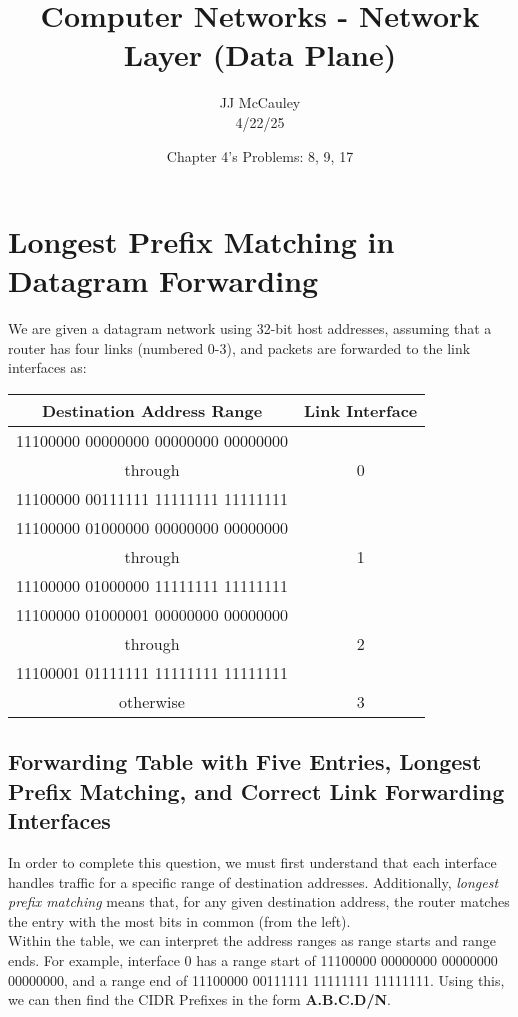 \documentclass[colorlinks=true, allcolors=blue]{article}
\title{Computer Networks - Network Layer (Data Plane)}
\author{JJ McCauley \\ 4/22/25}
\date{Chapter 4's Problems: 8, 9, 17}
\begin{document}
\maketitle

\setcounter{section}{7}
\section{Longest Prefix Matching in Datagram Forwarding}
We are given a datagram network using 32-bit host addresses, assuming that a router has four links (numbered 0-3), and packets are forwarded to the link interfaces as:

\renewcommand{\arraystretch}{1.5}
\begin{center}
\begin{tabular}{|c|c|}
\hline
\textbf{Destination Address Range} & \textbf{Link Interface} \\
\hline
11100000 00000000 00000000 00000000 & \\
through & 0 \\
11100000 00111111 11111111 11111111 & \\
\hline
11100000 01000000 00000000 00000000 & \\
through & 1 \\
11100000 01000000 11111111 11111111 & \\
\hline
11100000 01000001 00000000 00000000 & \\
through & 2 \\
11100001 01111111 11111111 11111111 & \\
\hline
otherwise & 3 \\
\hline  
\end{tabular}
\end{center}

\subsection{Forwarding Table with Five Entries, Longest Prefix Matching, and Correct Link Forwarding Interfaces}
In order to complete this question, we must first understand that each interface handles traffic for a specific range of destination addresses. Additionally, \textit{longest prefix matching} means that, for any given destination address, the router matches the entry with the most bits in common (from the left). \\

Within the table, we can interpret the address ranges as range starts and range ends. For example, interface 0 has a range start of 11100000 00000000 00000000 00000000, and a range end of 11100000 00111111 11111111 11111111. Using this, we can then find the CIDR Prefixes in the form \textbf{A.B.C.D/N}. \\
\end{document}
